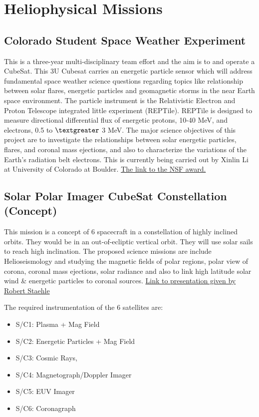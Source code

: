 \section{Heliophysical Missions}

\subsection{Colorado Student Space Weather Experiment}

This is a three-year multi-disciplinary team effort and the aim is to and operate a CubeSat. This 3U Cubesat carries an energetic particle sensor which will address fundamental space weather science questions regarding topics like relationship between solar flares, energetic particles and geomagnetic storms in the near Earth space environment. The particle instrument is the Relativistic Electron and Proton Telescope integrated little experiment (REPTile). REPTile is designed to measure directional differential flux of energetic protons, 10-40 MeV, and electrons, 0.5 to $\textgreater$ 3 MeV.  The major science objectives of this project are to investigate the relationships between solar energetic particles, flares, and coronal mass ejections, and also to characterize the variations of the Earth's radiation belt electrons. This is currently being carried out by Xinlin Li at University of Colorado at Boulder. \href{http://nsf.gov/awardsearch/showAward?AWD_ID=1042815&HistoricalAwards=false}{The link to the NSF award.}

\subsection{Solar Polar Imager CubeSat Constellation (Concept)}
This mission is a concept of 6 spacecraft in a constellation of highly inclined orbits. They would be in an out-of-ecliptic vertical orbit. They will use solar sails to reach high inclination. The proposed science missions are include Helioseismology and studying the magnetic fields of polar regions, polar view of corona, coronal mass ejections, solar radiance and also to link high latitude solar wind \& energetic particles to coronal sources.  \href{http://kiss.caltech.edu/cosponsored/cubesat2012/presentations/staehle-interplanetary-cubesat-missions.pdf}{Link to presentation given by Robert Staehle}

The required instrumentation of the 6  satellites are:
\begin{itemize}
\item S/C1: Plasma + Mag Field 
\item S/C2: Energetic Particles + Mag Field 
\item S/C3: Cosmic Rays, 
\item S/C4: Magnetograph/Doppler Imager 
\item S/C5: EUV Imager 
\item S/C6: Coronagraph 
\end{itemize}



